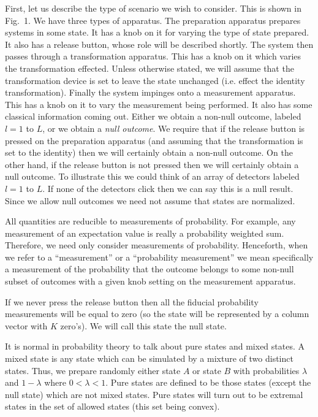 \documentclass[10pt]{article}
\begin{document}
First, let us describe the type of scenario we wish to consider. This is
shown in Fig.~1.  We have three types of apparatus. The preparation
apparatus prepares systems in some state.  It has a knob on it for
varying the type of state prepared. It also has a release button, whose
role will be described shortly.  The system then
passes through a transformation apparatus. This has a knob on
it which varies the transformation effected. Unless otherwise stated, we
will assume that the transformation device is set to leave the state
unchanged (i.e. effect the identity transformation).  Finally the system
impinges onto a measurement apparatus.  This has a knob on it to vary
the measurement being performed.  It also has some classical information
coming out. Either we obtain a non-null outcome, labeled $l=1$ to $L$, or we
obtain a {\it null outcome}.  We require that if the release button is
pressed on the preparation apparatus (and assuming that the
transformation is set to the identity) then we will certainly obtain a
non-null outcome. On the other hand, if the release button is not
pressed then we will certainly obtain a null outcome.  To illustrate
this we could think of an array of detectors labeled $l=1$ to $L$. If
none of the detectors click then we can say this is a null result.
Since we allow null outcomes we need not assume that states are
normalized.

All quantities are reducible to measurements of probability.  For
example, any measurement of an expectation value is really a probability
weighted sum.  Therefore, we need only consider measurements of probability.
Henceforth, when we refer to a ``measurement'' or a ``probability
measurement'' we mean specifically a measurement of the probability
that the outcome belongs to some non-null subset of outcomes with a
given knob setting on the measurement apparatus.

If we never press the release button then all the fiducial probability
measurements will be equal to zero (so the state will be represented by
a column vector with $K$ zero's). We will call this state the null state.

It is normal in probability theory to talk about pure states and mixed
states.  A mixed state is any state which can be simulated by a mixture
of two distinct states. Thus, we prepare randomly either state $A$ or
state $B$ with probabilities $\lambda$ and $1-\lambda$ where
$0<\lambda<1$.  Pure states are defined to be those states
(except the null state) which are not mixed states.  Pure states will
turn out to be extremal states in the set of allowed states (this set
being convex).
\end{document}
